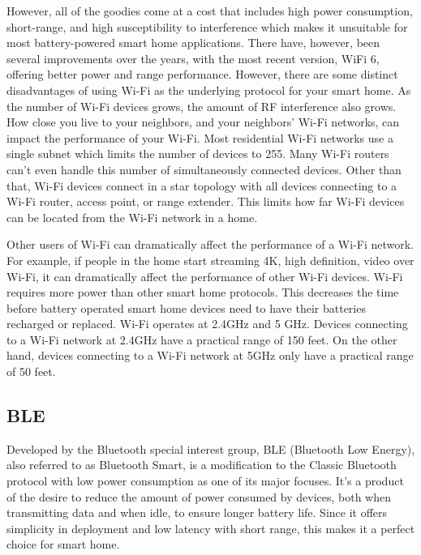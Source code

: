 However, all of the goodies come at a cost that includes high power consumption, short-range, and high susceptibility to interference which makes it unsuitable for most battery-powered smart home applications. There have, however, been several improvements over the years, with the most recent version, WiFi 6, offering better power and range performance. 
However, there are some distinct disadvantages of using Wi-Fi as the underlying protocol for your smart home. As the number of Wi-Fi devices grows, the amount of RF interference also grows. How close you live to your neighbors, and your neighbors’ Wi-Fi networks, can impact the performance of your Wi-Fi. Most residential Wi-Fi networks use a single subnet which limits the number of devices to 255. Many Wi-Fi routers can’t even handle this number of simultaneously connected devices. Other than that, Wi-Fi devices connect in a star topology with all devices connecting to a Wi-Fi router, access point, or range extender. This limits how far Wi-Fi devices can be located from the Wi-Fi network in a home.

Other users of Wi-Fi can dramatically affect the performance of a Wi-Fi network. For example, if people in the home start streaming 4K, high definition, video over Wi-Fi, it can dramatically affect the performance of other Wi-Fi devices. Wi-Fi requires more power than other smart home protocols. This decreases the time before battery operated smart home devices need to have their batteries recharged or replaced. Wi-Fi operates at 2.4GHz and 5 GHz. Devices connecting to a Wi-Fi network at 2.4GHz have a practical range of 150 feet. On the other hand, devices connecting to a Wi-Fi network at 5GHz only have a practical range of 50 feet.
\subsection{BLE}
Developed by the Bluetooth special interest group, BLE (Bluetooth Low Energy), also referred to as Bluetooth Smart, is a modification to the Classic Bluetooth protocol with low power consumption as one of its major focuses. It's a product of the desire to reduce the amount of power consumed by devices, both when transmitting data and when idle, to ensure longer battery life. Since it offers simplicity in deployment and low latency with short range, this makes it a perfect choice for smart home.  

